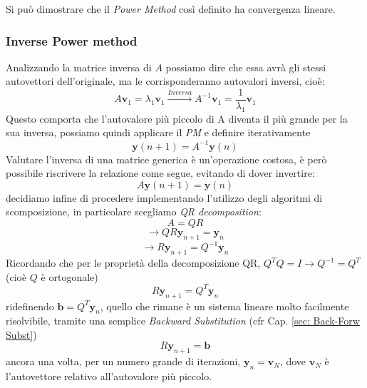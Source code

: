 \documentclass[11pt, a4paper]{article}
\begin{document}
\noindent Si può dimostrare che il \textit{Power Method} così definito ha convergenza lineare.

\subsubsection{Inverse Power method} \label{sec: Inverse Pow mth}
Analizzando la matrice inversa di $A$ possiamo dire che essa avrà gli stessi autovettori dell'originale, ma le corrisponderanno autovalori inversi, cioè:
\[
A\boldsymbol v_1 =\lambda_1 \boldsymbol v_1 \xrightarrow{Inversa} A^{-1}\boldsymbol v_1 = \frac{1}{\lambda_1} \boldsymbol v_1
\]
Questo comporta che l'autovalore più piccolo di A diventa il più grande per la sua inversa, possiamo quindi applicare il \textit{PM} e definire iterativamente
\[
\boldsymbol	y(n+1) = A^{-1}\boldsymbol y(n)
\]
Valutare l'inversa di una matrice generica è un'operazione costosa, è però possibile riscrivere la relazione come segue, evitando di dover invertire:
\[
A\boldsymbol y(n+1) = \boldsymbol y(n)
\]
decidiamo infine di procedere implementando l'utilizzo degli algoritmi di scomposizione, in particolare scegliamo \textit{QR decomposition}: 
\[
A = QR 
\]
\[
\longrightarrow{} QR\boldsymbol y_{n+1} = \boldsymbol y_n
\]
\[
\longrightarrow{}R\boldsymbol y_{n+1} = Q^{-1} \boldsymbol y_n
\]
Ricordando che per le proprietà della decomposizione QR, $Q^TQ = I \longrightarrow{}Q^{-1} = Q^T$ (cioè $Q$ è ortogonale)
\[
R\boldsymbol y_{n+1} = Q^T \boldsymbol y_n
\]
ridefinendo $\boldsymbol{b} = Q^T \boldsymbol y_n$, quello che rimane è un sistema lineare molto facilmente risolvibile, tramite una semplice \textit{Backward Substitution} (cfr Cap. \ref{sec: Back-Forw Subst})
\[
R\boldsymbol y_{n+1} = \boldsymbol{b}
\]
ancora una volta, per un numero grande di iterazioni, $\boldsymbol y_n = \boldsymbol v_N$, dove $\boldsymbol v_N$ è l'autovettore relativo all'autovalore più piccolo.
\end{document}
